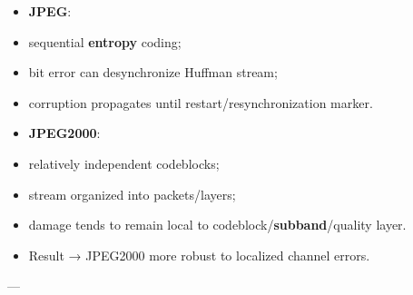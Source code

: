\begin{itemize}
  \item \textbf{JPEG}:
  \item sequential \textbf{entropy} coding;
  \item bit error can desynchronize Huffman stream;
  \item corruption propagates until restart/resynchronization marker.
  \item \textbf{JPEG2000}:
  \item relatively independent codeblocks;
  \item stream organized into packets/layers;
  \item damage tends to remain local to codeblock/\textbf{subband}/quality layer.
  \item Result → JPEG2000 more robust to localized channel errors.
\end{itemize}

---


